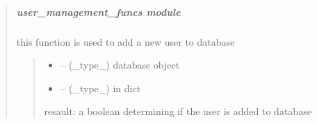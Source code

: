 \documentclass[letterpaper,10pt,english]{sphinxmanual}
\begin{document}
\begin{quote}
\begin{savenotes}
\begin{fulllineitems}
\end{fulllineitems}\end{savenotes}


\sphinxstepscope


\subparagraph{user\_management\_funcs module}
\label{\detokenize{setting/backend/user_management_funcs:module-oxin.backend.user_management_funcs}}\label{\detokenize{setting/backend/user_management_funcs:user-management-funcs-module}}\label{\detokenize{setting/backend/user_management_funcs::doc}}

\begin{savenotes}\begin{fulllineitems}
\label{\detokenize{setting/backend/user_management_funcs:oxin.backend.user_management_funcs.add_new_user_to_db}}
\pysigstartsignatures
{}
\pysigstopsignatures
\sphinxAtStartPar
this function is used to add a new user to database
\begin{quote}\begin{description}
\begin{itemize}
\item {} 
\sphinxAtStartPar
{} – (\_type\_) database object

\item {} 
\sphinxAtStartPar
{} – (\_type\_) in dict

\end{itemize}

\sphinxAtStartPar
resault: a boolean determining if the user is added to database

\end{description}\end{quote}

\end{fulllineitems}\end{savenotes}


\end{quote}
\end{document}
